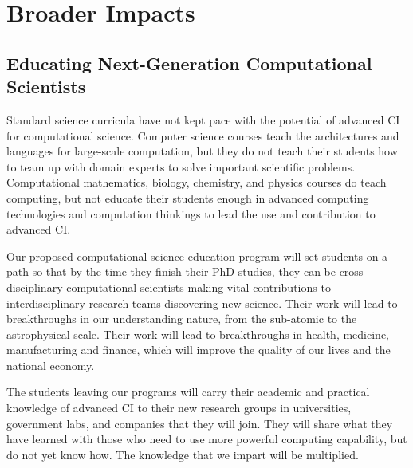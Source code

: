 \documentclass[11pt]{NSFamsart}
\begin{document}
\section{Broader Impacts}

\subsection{Educating Next-Generation Computational Scientists}
Standard science curricula have not kept pace with the potential of advanced CI for computational science.  Computer science courses teach the architectures and languages for large-scale computation, but they do not teach their students how to team up with domain experts to solve important scientific problems.  Computational mathematics, biology, chemistry, and physics courses do teach computing, but not educate their students enough in advanced computing technologies and computation thinkings to lead the use and contribution to advanced CI.

Our proposed computational science education program will set students on a path so that by the time they finish their PhD studies, they can be cross-disciplinary computational scientists making vital contributions to interdisciplinary research teams discovering new science.  Their work will lead to breakthroughs in our understanding nature, from the sub-atomic to the astrophysical scale.  Their work will lead to breakthroughs in health, medicine,  manufacturing and finance, which will improve the quality of our lives and the national economy. 

The students leaving our programs will carry their academic and practical knowledge of advanced CI to their new research groups in universities, government labs, and companies that they will join.  They will share what they have learned with those who need to use more powerful computing capability, but do not yet know how.  The knowledge that we impart will be multiplied.
\end{document}
